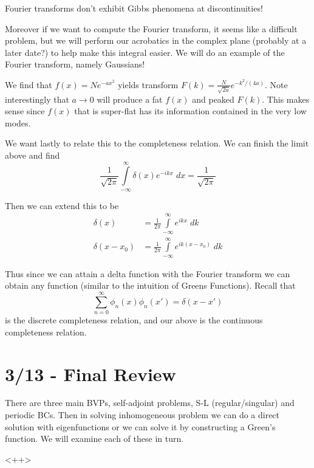 \documentclass[10pt]{report}
\begin{document}
Fourier transforms don't exhibit Gibbs phenomena at discontinuities!

Moreover if we want to compute the Fourier transform, it seems like a difficult problem, but we will perform our acrobatics in the complex plane (probably at a later date?) to help make this integral easier. We will do an example of the Fourier transform, namely Gaussians!

We find that $f(x) = Ne^{-ax^2}$ yields transform $F(k) = \frac{N}{\sqrt{2a}}e^{-k^2/(4a)}$. Note interestingly that $a \to 0$ will produce a fat $f(x)$ and peaked $F(k)$. This makes sense since $f(x)$ that is super-flat has its information contained in the very low modes. 

We want lastly to relate this to the completeness relation. We can finish the limit above and find
\begin{equation}
    \frac{1}{\sqrt{2\pi}}\displaystyle\int\limits_{-\infty}^{\infty}\delta(x)e^{-ikx}\;dx = \frac{1}{\sqrt{2\pi}}
\end{equation}

Then we can extend this to be
\begin{align}
    \delta(x) &= \frac{1}{2\pi}\displaystyle\int\limits_{-\infty}^{\infty}e^{ikx}\;dk\\
    \delta(x-x_0) &= \frac{1}{2\pi}\displaystyle\int\limits_{-\infty}^{\infty}e^{ik(x-x_0)}\;dk
\end{align}

Thus since we can attain a delta function with the Fourier transform we can obtain any function (similar to the intuition of Greens Functions). Recall that
\begin{equation}
    \sum_{n=0}^{\infty}\phi_n(x)\phi_n(x') = \delta(x-x')
\end{equation}
is the discrete completeness relation, and our above is the continuous completeness relation. 

\chapter{3/13 - Final Review}

There are three main BVPs, self-adjoint problems, S-L (regular/singular) and periodic BCs. Then in solving inhomogeneous problem we can do a direct solution with eigenfunctions or we can solve it by constructing a Green's function. We will examine each of these in turn.

<++>
\end{document}

